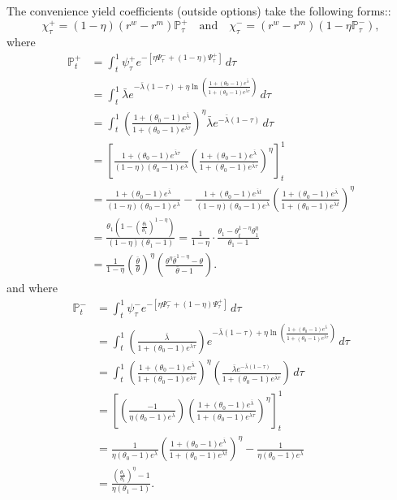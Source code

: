 The convenience yield coefficients (outside options) take the following forms::
\begin{equation}
\chi_\tau^+ = (1-\eta)(r^w - r^m)\mathbb{P}_\tau^+ \quad \text{and} \quad \chi_\tau^- = (r^w - r^m)(1 - \eta\mathbb{P}_\tau^-),
\end{equation}
where
\begin{align*}
\mathbb{P}_t^+ &= \int_t^1 \psi_\tau^+ e^{-[\eta\Psi_\tau^- + (1-\eta)\Psi_\tau^+]} \, d\tau\\
&= \int_t^1 \bar{\lambda} e^{-\bar{\lambda}(1-\tau) + \eta\ln\left(\frac{1 + (\theta_0 - 1)e^{\bar{\lambda}}}{1 + (\theta_0 - 1)e^{\bar{\lambda}\tau}}\right)} \, d\tau\\
&= \int_t^1 \left(\frac{1 + (\theta_0 - 1)e^{\bar{\lambda}}}{1 + (\theta_0 - 1)e^{\bar{\lambda}\tau}}\right)^{\eta} \bar{\lambda} e^{-\bar{\lambda}(1-\tau)} \, d\tau\\
&= \left[\frac{1 + (\theta_0 - 1)e^{\bar{\lambda}\tau}}{(1-\eta)(\theta_0 - 1)e^{\bar{\lambda}}} \left(\frac{1 + (\theta_0 - 1)e^{\bar{\lambda}}}{1 + (\theta_0 - 1)e^{\bar{\lambda}\tau}}\right)^{\eta}\right]_t^1\\
&= \frac{1 + (\theta_0 - 1)e^{\bar{\lambda}}}{(1-\eta)(\theta_0 - 1)e^{\bar{\lambda}}} - \frac{1 + (\theta_0 - 1)e^{\bar{\lambda}t}}{(1-\eta)(\theta_0 - 1)e^{\bar{\lambda}}} \left(\frac{1 + (\theta_0 - 1)e^{\bar{\lambda}}}{1 + (\theta_0 - 1)e^{\bar{\lambda}t}}\right)^{\eta}\\
&= \frac{\theta_1\left(1 - \left(\frac{\theta_t}{\theta_1}\right)^{1-\eta}\right)}{(1-\eta)(\theta_1 - 1)} = \frac{1}{1-\eta} \cdot \frac{\theta_1 - \theta_t^{1-\eta}\theta_1^{\eta}}{\theta_1 - 1}\\
&= \frac{1}{1-\eta} \left(\frac{\bar{\theta}}{\theta}\right)^{\eta} \left(\frac{\theta^{\eta}\bar{\theta}^{1-\eta} - \theta}{\bar{\theta} - 1}\right).
\end{align*}
and where
\begin{align*}
\mathbb{P}_t^- &= \int_t^1 \psi_\tau^- e^{-[\eta\Psi_\tau^- + (1-\eta)\Psi_\tau^+]} \, d\tau\\
&= \int_t^1 \left(\frac{\bar{\lambda}}{1 + (\theta_0 - 1)e^{\bar{\lambda}\tau}}\right) e^{-\bar{\lambda}(1-\tau) + \eta\ln\left(\frac{1 + (\theta_0 - 1)e^{\bar{\lambda}}}{1 + (\theta_0 - 1)e^{\bar{\lambda}\tau}}\right)} \, d\tau\\
&= \int_t^1 \left(\frac{1 + (\theta_0 - 1)e^{\bar{\lambda}}}{1 + (\theta_0 - 1)e^{\bar{\lambda}\tau}}\right)^{\eta} \left(\frac{\bar{\lambda}e^{-\bar{\lambda}(1-\tau)}}{1 + (\theta_0 - 1)e^{\bar{\lambda}\tau}}\right) \, d\tau\\
&= \left[\left(\frac{-1}{\eta(\theta_0 - 1)e^{\bar{\lambda}}}\right) \left(\frac{1 + (\theta_0 - 1)e^{\bar{\lambda}}}{1 + (\theta_0 - 1)e^{\bar{\lambda}\tau}}\right)^{\eta}\right]_t^1\\
&= \frac{1}{\eta(\theta_0 - 1)e^{\bar{\lambda}}} \left(\frac{1 + (\theta_0 - 1)e^{\bar{\lambda}}}{1 + (\theta_0 - 1)e^{\bar{\lambda}t}}\right)^{\eta} - \frac{1}{\eta(\theta_0 - 1)e^{\bar{\lambda}}}\\
&= \frac{\left(\frac{\theta_1}{\theta_t}\right)^{\eta} - 1}{\eta(\theta_1 - 1)}.
\end{align*}

